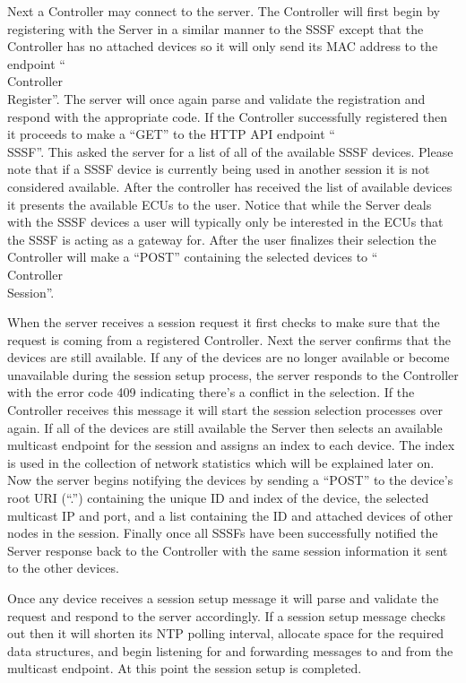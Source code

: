 \documentclass[letterpaper,twocolumn,12pt]{article}
\begin{document}
Next a Controller may connect to the server. The Controller will first begin by registering with the Server in a similar manner to the SSSF except that the Controller has no attached devices so it will only send its MAC address to the endpoint “\\Controller\\Register”. The server will once again parse and validate the registration and respond with the appropriate code. If the Controller successfully registered then it proceeds to make a “GET” to the HTTP API endpoint “\\SSSF”. This asked the server for a list of all of the available SSSF devices. Please note that if a SSSF device is currently being used in another session it is not considered available. After the controller has received the list of available devices it presents the available ECUs to the user. Notice that while the Server deals with the SSSF devices a user will typically only be interested in the ECUs that the SSSF is acting as a gateway for. After the user finalizes their selection the Controller will make a “POST” containing the selected devices to “\\Controller\\Session”.

When the server receives a session request it first checks to make sure that the request is coming from a registered Controller. Next the server confirms that the devices are still available. If any of the devices are no longer available or become unavailable during the session setup process, the server responds to the Controller with the error code 409 indicating there's a conflict in the selection. If the Controller receives this message it will start the session selection processes over again. If all of the devices are still available the Server then selects an available multicast endpoint for the session and assigns an index to each device. The index is used in the collection of network statistics which will be explained later on. Now the server begins notifying the devices by sending a “POST” to the device’s root URI (“.”) containing the unique ID and index of the device, the selected multicast IP and port, and a list containing the ID and attached devices of other nodes in the session. Finally once all SSSFs have been successfully notified the Server response back to the Controller with the same session information it sent to the other devices.

Once any device receives a session setup message it will parse and validate the request and respond to the server accordingly. If a session setup message checks out then it will shorten its NTP polling interval, allocate space for the required data structures, and begin listening for and forwarding messages to and from the multicast endpoint. At this point the session setup is completed.
\end{document}
